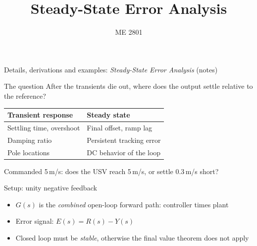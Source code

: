 \documentclass[aspectratio=169,11pt]{beamer}
\title{Steady-State Error Analysis}
\subtitle{ME 2801}
\author{}
\date{}
\begin{document}
\begin{frame}
  \titlepage
  \centering\small Details, derivations and examples: \emph{Steady-State Error Analysis} (notes)
\end{frame}

\begin{frame}{The question}
  After the transients die out, where does the output settle relative to the reference?

  \bigskip
  \begin{center}
  \begin{tabular}{ll}
    \toprule
    Transient response        & Steady state \\
    \midrule
    Settling time, overshoot  & Final offset, ramp lag \\
    Damping ratio             & Persistent tracking error \\
    Pole locations            & DC behavior of the loop \\
    \bottomrule
  \end{tabular}
  \end{center}

  \bigskip
  Commanded 5\,m/s: does the USV reach 5\,m/s, or settle 0.3\,m/s short?
\end{frame}

\begin{frame}{Setup: unity negative feedback}
  \begin{center}
  \end{center}

  \begin{itemize}
    \item $G(s)$ is the \emph{combined} open-loop forward path: controller times plant
    \item Error signal: $E(s) = R(s) - Y(s)$
    \item Closed loop must be \emph{stable}, otherwise the final value theorem does not apply
  \end{itemize}
\end{frame}
\end{document}
